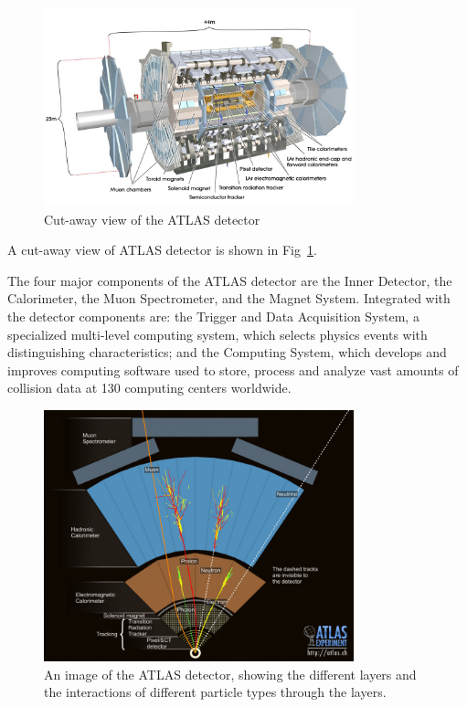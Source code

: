 \begin{figure}[htbp]
 \begin{center}
 \includegraphics[width=0.8\textwidth]{chapters/c4/figures/atlas.jpg}
 \end{center}
 \caption{Cut-away view of the ATLAS detector}
 \label{fig:cutaway}
\end{figure}
A cut-away view of ATLAS detector is shown in Fig~\ref{fig:cutaway}.
\par The four major components of the ATLAS detector are the Inner Detector, the Calorimeter, the Muon Spectrometer,
 and the Magnet System. Integrated with the detector components are: the Trigger and Data Acquisition System, 
a specialized multi-level computing system, which selects physics events with distinguishing characteristics; 
and the Computing System, which develops and improves computing software used to store, process and analyze vast amounts of collision data 
at 130 computing centers worldwide\cite{atlas}.
\begin{figure}[htbp]
 \begin{center}
 \includegraphics[width=0.8\textwidth]{chapters/c4/figures/eve_gen.jpg}
 \end{center}
 \caption{An image of
the ATLAS detector, showing the
different layers and the interactions
of different particle types through
the layers.}
 \label{fig:eve-gen}
\end{figure}
